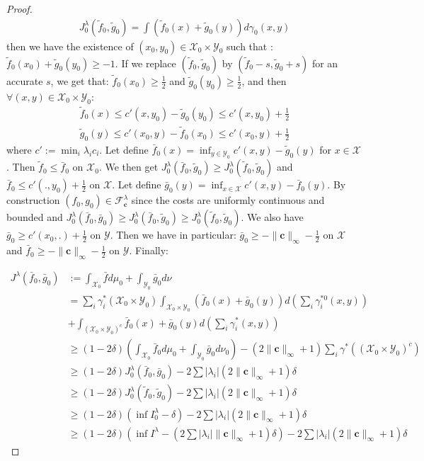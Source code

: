 \begin{proof}
\begin{align*}
J_0^\lambda(\tilde{f}_0,\tilde{g}_0) = \int (\tilde{f}_0(x)+\tilde{g}_0(y))d\gamma_0(x,y)
\end{align*}
then we have the existence of $(x_0,y_0)\in\mathcal{X}_0\times\mathcal{Y}_0$ such that : $\tilde{f}_0(x_0)+\tilde{g}_0(y_0)\geq -1$. If we replace $(\tilde{f}_0,\tilde{g}_0)$ by $(\tilde{f}_0-s,\tilde{g}_0+s)$ for an accurate $s$, we get that: $\tilde{f}_0(x_0)\geq \frac12$
and $\tilde{g}_0(y_0)\geq \frac12$, and then $\forall(x,y)\in\mathcal{X}_0\times\mathcal{Y}_0$:
\begin{align*}
    \tilde{f}_0(x)\leq c'(x,y_0)-\tilde{g}_0(y_0)\leq c'(x,y_0)+\frac12\\
    \tilde{g}_0(y)\leq c'(x_0,y)-\tilde{f}_0(x_0)\leq c'(x_0,y)+\frac12
\end{align*}
where $c':=\min_i\lambda_ic_i$.  Let define $\bar{f}_0(x) = \inf_{y\in\mathcal{Y}_0}c'(x,y)-\tilde{g}_0(y)$ for $x\in\mathcal{X}$.  Then $\tilde{f}_0\leq \bar{f}_0$ on $\mathcal{X}_0$. We then get $J_0^\lambda(\bar{f}_0,\tilde{g}_0)\geq J_0^\lambda(\tilde{f}_0,\tilde{g}_0)$ and $\bar{f}_0\leq c'(.,y_0)+\frac12$ on $\mathcal{X}$. Let define $\bar{g}_0(y)= \inf_{x\in\mathcal{X}}c'(x,y)-\bar{f}_0(y)$. By construction $(f_0,g_0)\in \mathcal{F}
^\lambda_\mathbf{c}$ since the costs are uniformly continuous and bounded and $J_0^\lambda(\bar{f}_0,\bar{g}_0)\geq J_0^\lambda(\bar{f}_0,\tilde{g}_0)\geq J_0^\lambda(\tilde{f}_0,\tilde{g}_0)$. We also have  $\bar{g}_0\geq c'(x_0,.)+\frac12$ on $\mathcal{Y}$. Then we have in particular: $\bar{g}_0\geq -\lVert\mathbf{c}\rVert_\infty-\frac12$ on $\mathcal{X}$ and $\bar{f}_0\geq -\lVert\mathbf{c}\rVert_\infty-\frac12$ on $\mathcal{Y}$. Finally:

\begin{align*}
J^\lambda(\bar{f}_0,\bar{g}_0)&:=\int_{\mathcal{X}_0}\bar{f}d\mu_0+\int_{\mathcal{Y}_0}\bar{g}_0d\nu\\
&=\sum_i\gamma_i^*(\mathcal{X}_0\times\mathcal{Y}_0)\int_{\mathcal{X}_0\times\mathcal{Y}_0}(\bar{f}_0(x)+\bar{g}_0(y))d\left(\sum_i\gamma^{*0}_i(x,y)\right)\\
&+\int_{(\mathcal{X}_0\times\mathcal{Y}_0)^c}\bar{f}_0(x)+\bar{g}_0(y)d\left(\sum_i\gamma^{*}_i(x,y)\right)\\
&\geq (1-2\delta)\left(\int_{\mathcal{X}_0}\bar{f}_0d\mu_0+\int_{\mathcal{Y}_0}\bar{g}_0d\nu_0\right)-(2\lVert\mathbf{c}\rVert_\infty+1)\sum_i\gamma^*((\mathcal{X}_0\times\mathcal{Y}_0)^c)\\
&\geq (1-2\delta)J_0^\lambda(\bar{f}_0,\bar{g}_0)-2\sum |\lambda_i|(2\lVert\mathbf{c}\rVert_\infty+1)\delta\\
&\geq (1-2\delta)J_0^\lambda(\tilde{f}_0,\tilde{g}_0)-2\sum |\lambda_i|(2\lVert\mathbf{c}\rVert_\infty+1)\delta\\
&\geq (1-2\delta)(\inf I^\lambda_0-\delta)-2\sum |\lambda_i|(2\lVert\mathbf{c}\rVert_\infty+1)\delta\\
&\geq  (1-2\delta)(\inf I^\lambda-(2\sum |\lambda_i|\lVert\mathbf{c}\rVert_\infty+1)\delta)-2\sum |\lambda_i|(2\lVert\mathbf{c}\rVert_\infty+1)\delta
\end{align*}


\end{proof}
